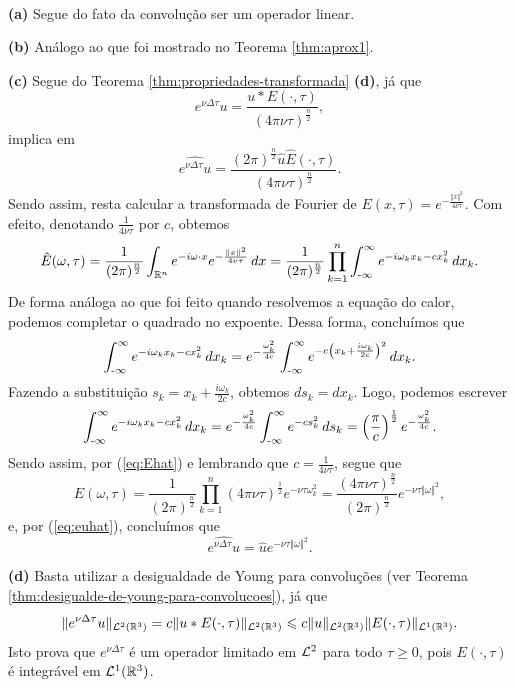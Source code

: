 \begin{prf}~

    \textbf{(a)} Segue do fato da convolução ser um operador linear.

    \textbf{(b)} Análogo ao que foi mostrado no Teorema \ref{thm:aprox1}.

    \textbf{(c)} Segue do Teorema \ref{thm:propriedades-transformada} \textbf{(d)}, já que
    \[
        e^{\nu \Delta \tau} u = \frac{u * E(\cdot,\tau)}{(4\pi \nu \tau)^{\frac{n}{2}}},
    \]
    implica em
    \begin{equation} \label{eq:euhat}
        \widehat{e^{\nu \Delta \tau} u} = \frac{(2\pi)^{\frac{n}{2}} \hat u \hat E(\cdot,\tau)}{(4\pi\nu\tau)^{\frac{n}{2}}}.
    \end{equation}
    Sendo assim, resta calcular a transformada de Fourier de $E(x,\tau) = e^{-\frac{\Vert x \Vert^2}{4\nu\tau}}$.
    Com efeito, denotando $\frac{1}{4\nu\tau}$ por $c$, obtemos
    \begin{equation} \label{eq:Ehat}
        \hat{E}(\omega,\tau) = \frac{1}{(2\pi)^{\frac{n}{2}}}\int_{\mathbb{R}^n} e^{-i\omega\cdot x} e^{-\frac{\Vert x \Vert^2}{4\nu\tau}} \,dx = \frac{1}{(2\pi)^{\frac{n}{2}}} \prod_{k=1}^n \int_{\text{-}\infty}^\infty e^{-i\omega_k x_k - cx_k^2} \,dx_k.
    \end{equation}
    De forma análoga ao que foi feito quando resolvemos a equação do calor, podemos completar o quadrado no expoente. Dessa forma, concluímos que
    \[
        \int_{\text{-}\infty}^\infty e^{-i\omega_k x_k - cx_k^2} \,dx_k = e^{-\frac{\omega_k^2}{4c}}\int_{\text{-}\infty}^\infty e^{-c\left( x_k + \frac{i\omega_k}{2c} \right)^2} \,dx_k. 
    \]
    Fazendo a substituição $s_k = x_k + \frac{i\omega_k}{2c}$, obtemos $ds_k = dx_k$. Logo, podemos escrever
    \[
        \int_{\text{-}\infty}^\infty e^{-i\omega_k x_k - cx_k^2} \,dx_k = e^{-\frac{\omega_k^2}{4c}}\int_{\text{-}\infty}^\infty e^{-cs_k^2} \,ds_k = \left( \frac{\pi}{c} \right)^{\frac{1}{2}} e^{-\frac{\omega_k^2}{4c}}. 
    \]
    Sendo assim, por (\ref{eq:Ehat}) e lembrando que $c = \frac{1}{4\nu\tau}$, segue que
    \[
        \hat E(\omega,\tau) = \frac{1}{(2\pi)^{\frac{n}{2}}} \prod_{k=1}^n (4\pi \nu \tau)^{\frac{1}{2}} e^{-\nu \tau \omega_k^2} = \frac{(4\pi\nu\tau)^{\frac{n}{2}}}{(2\pi)^{\frac{n}{2}}} e^{-\nu\tau \Vert \omega \Vert^2},
    \]
    e, por (\ref{eq:euhat}), concluímos que
    \[
        \widehat{e^{\nu\Delta \tau} u} = \hat u e^{-\nu\tau \Vert \omega \Vert^2}.
    \]

    \textbf{(d)} Basta utilizar a desigualdade de Young para convoluções (ver Teorema \ref{thm:desigualde-de-young-para-convolucoes}), já que
    \[
        \Vert e^{\nu\Delta\tau} u \Vert_{\mathcal{L}^2(\mathbb{R}^3)} = c \Vert u * E(\cdot,\tau) \Vert_{\mathcal{L}^2(\mathbb{R}^3)} \leqslant c \Vert u \Vert_{\mathcal{L}^2(\mathbb{R}^3)} \Vert E(\cdot,\tau) \Vert_{\mathcal{L}^1(\mathbb{R}^3)}.
    \]
    Isto prova que $e^{\nu\Delta\tau}$ é um operador limitado em $\mathcal{L}^2$ para todo $\tau \geqslant 0$, pois $E(\cdot,\tau)$ é integrável em $\mathcal{L}^1(\mathbb{R}^3)$.
\end{prf}

